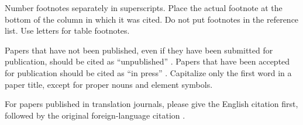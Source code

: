 \documentclass[conference,a4paper,flushend]{neutr}
\begin{document}
Number footnotes separately in superscripts. Place the actual footnote at the bottom of the column in which it was cited. Do not put footnotes in the reference list. Use letters for table footnotes.

Papers that have not been published, even if they have been submitted for publication, should be cited as “unpublished” \cite{four}. Papers that have been accepted for publication should be cited as “in press” \cite{five}. Capitalize only the first word in a paper title, except for proper nouns and element symbols.

For papers published in translation journals, please give the English citation first, followed by the original foreign-language citation \cite{yorozu1987electron}.

\nocite{kornack2001cell}
\nocite{kito2013emergent}
\nocite{goto2007efficient}


\begingroup
\sloppy
\printbibliography[notcategory=selfref]
\endgroup 
\end{document}
